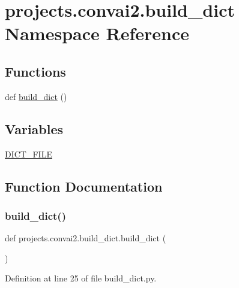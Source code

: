 \hypertarget{namespaceprojects_1_1convai2_1_1build__dict}{}\section{projects.\+convai2.\+build\+\_\+dict Namespace Reference}
\label{namespaceprojects_1_1convai2_1_1build__dict}
\subsection*{Functions}
\begin{DoxyCompactItemize}
\item 
def \hyperlink{namespaceprojects_1_1convai2_1_1build__dict_a0e5fa5d8d2bd2bc934e287a49d2d60c7}{build\+\_\+dict} ()
\end{DoxyCompactItemize}
\subsection*{Variables}
\begin{DoxyCompactItemize}
\item 
\hyperlink{namespaceprojects_1_1convai2_1_1build__dict_af45450500d405cd80212e1dbc72221e6}{D\+I\+C\+T\+\_\+\+F\+I\+LE}
\end{DoxyCompactItemize}


\subsection{Function Documentation}
\mbox{\label{namespaceprojects_1_1convai2_1_1build__dict_a0e5fa5d8d2bd2bc934e287a49d2d60c7}} 
\subsubsection{\texorpdfstring{build\+\_\+dict()}{build\_dict()}}
{\footnotesize\ttfamily def projects.\+convai2.\+build\+\_\+dict.\+build\+\_\+dict (\begin{DoxyParamCaption}{ }\end{DoxyParamCaption})}



Definition at line 25 of file build\+\_\+dict.\+py.


